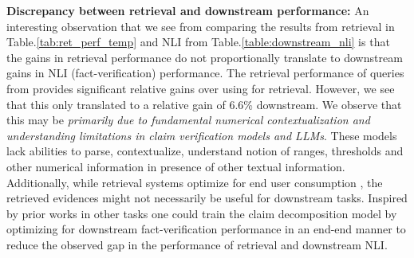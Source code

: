 \textbf{Discrepancy between retrieval and downstream performance:} An interesting observation that we see from comparing the results from retrieval in Table.\ref{tab:ret_perf_temp} and NLI from Table.\ref{table:downstream_nli} is that the gains in retrieval performance do not proportionally translate to downstream gains in NLI (fact-verification) performance. The retrieval performance of queries from \name{} provides significant relative gains %
over using \claimonly{} for retrieval. However, we see that this only translated to a relative gain of 6.6\% downstream. We observe that this may be \emph{primarily due to fundamental  numerical contextualization and understanding limitations in claim verification models and LLMs}. These models lack abilities to parse, contextualize, understand notion of ranges, thresholds and other numerical information in presence of other textual information.  Additionally, while retrieval systems optimize for end user consumption \cite{ret-enh-ml}, the retrieved evidences might not necessarily be useful for downstream tasks. Inspired by prior works in other tasks \cite{zhang-etal-2023-relevance} one could train the claim decomposition model by optimizing for downstream fact-verification performance in an end-end manner to reduce the observed gap in the performance of retrieval and downstream NLI. 



